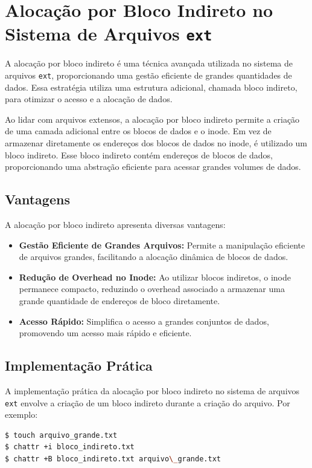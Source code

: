 \documentclass[
	12pt,				%
	openright,			%
	oneside,			%
	a4paper,			%
	chapter=TITLE,		%
	english,			%
	french,				%
	spanish,			%
	brazil				%
	]{abntex2}
\theoremstyle{definition}
\begin{document}
\section{Alocação por Bloco Indireto no Sistema de Arquivos \texttt{ext}}
A alocação por bloco indireto é uma técnica avançada utilizada no sistema de arquivos \texttt{ext}, proporcionando uma gestão eficiente de grandes quantidades de dados. Essa estratégia utiliza uma estrutura adicional, chamada bloco indireto, para otimizar o acesso e a alocação de dados.

Ao lidar com arquivos extensos, a alocação por bloco indireto permite a criação de uma camada adicional entre os blocos de dados e o inode. Em vez de armazenar diretamente os endereços dos blocos de dados no inode, é utilizado um bloco indireto. Esse bloco indireto contém endereços de blocos de dados, proporcionando uma abstração eficiente para acessar grandes volumes de dados.

\subsection{Vantagens}
A alocação por bloco indireto apresenta diversas vantagens:

\begin{itemize}
    \item \textbf{Gestão Eficiente de Grandes Arquivos:} Permite a manipulação eficiente de arquivos grandes, facilitando a alocação dinâmica de blocos de dados.
    
    \item \textbf{Redução de Overhead no Inode:} Ao utilizar blocos indiretos, o inode permanece compacto, reduzindo o overhead associado a armazenar uma grande quantidade de endereços de bloco diretamente.
    
    \item \textbf{Acesso Rápido:} Simplifica o acesso a grandes conjuntos de dados, promovendo um acesso mais rápido e eficiente.
\end{itemize}

\subsection{Implementação Prática}
A implementação prática da alocação por bloco indireto no sistema de arquivos \texttt{ext} envolve a criação de um bloco indireto durante a criação do arquivo. Por exemplo:

\begin{lstlisting}[language=bash, caption={Exemplo de Alocação por Bloco Indireto}]
$ touch arquivo_grande.txt  
$ chattr +i bloco_indireto.txt  
$ chattr +B bloco_indireto.txt arquivo\_grande.txt  
\end{lstlisting}
\end{document}

